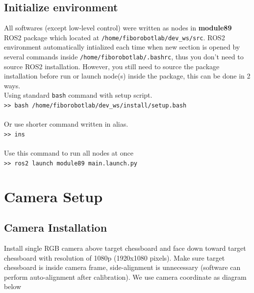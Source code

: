 \documentclass[11pt,fleqn]{book} %
\begin{document}
\subsection{Initialize environment}
All softwares (except low-level control) were written as nodes in \textbf{module89} ROS2 package which located at \texttt{/home/fiborobotlab/dev\_ws/src}.
ROS2 environment automatically intialized each time when new section is opened by several commands inside \texttt{/home/fiborobotlab/.bashrc}, thus you don't need to source ROS2 installation. However, you still need to source the package installation before run or launch node(s) inside the package, this can be done in 2 ways.\\
Using standard \texttt{bash} command with setup script.\\
\texttt{>> bash /home/fiborobotlab/dev\_ws/install/setup.bash}\\
\\
Or use shorter command written in alias.\\
\texttt{>> ins}\\
\\
Use this command to run all nodes at once \\
\texttt{>> ros2 launch module89 main.launch.py}\\

\section{Camera Setup}
\subsection{Camera Installation}
Install single RGB camera above target chessboard and face down toward target chessboard with resolution of 1080p (1920x1080 pixels). Make sure target chessboard is inside camera frame, side-alignment is unnecessary (software can perform auto-alignment after calibration). We use camera coordinate as diagram below
\end{document}
